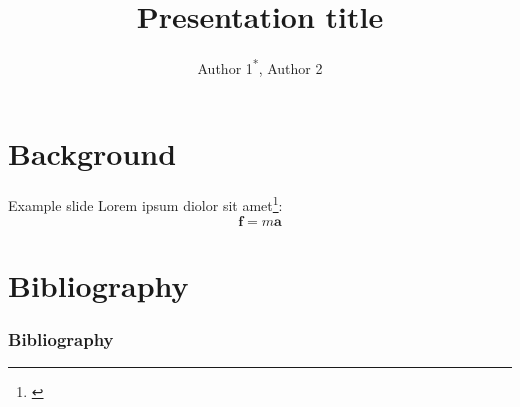 \documentclass[11pt,aspectratio=169]{beamer}
\author[Author 1 (NJIT)]{Author 1\textsuperscript{*}, Author 2}
\title[Short title]{Presentation title}
\begin{document}
\begin{frame}
\titlepage
\end{frame}

\section{Background}

\begin{frame}{Example slide}
Lorem ipsum diolor sit amet\footnote{\cite{khalizov2009enhanced}}:
$$
    \mathbf{f}=m\mathbf{a}
$$
\end{frame}

\section{Bibliography}

\begin{frame}[t,allowframebreaks]
\frametitle{Bibliography}
\printbibliography
\end{frame}
\end{document}
